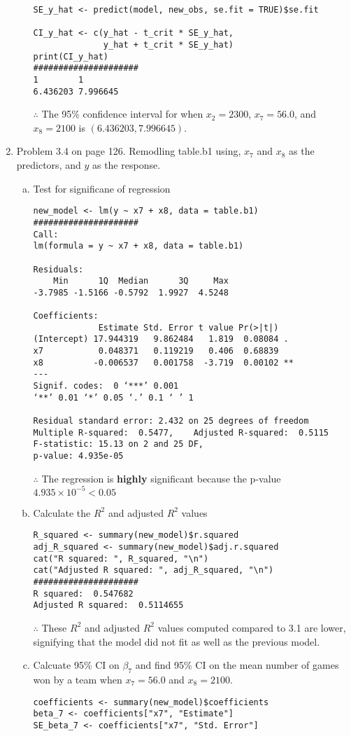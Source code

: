 \documentclass[12pt]{article}
\begin{document}
\begin{enumerate}[1.]
\begin{enumerate}[a.]
\begin{verbatim}
SE_y_hat <- predict(model, new_obs, se.fit = TRUE)$se.fit

CI_y_hat <- c(y_hat - t_crit * SE_y_hat, 
              y_hat + t_crit * SE_y_hat)
print(CI_y_hat)
#####################
1        1 
6.436203 7.996645 
                    \end{verbatim}
                    $\therefore$ The 95\% confidence interval for when $x_2 = 2300$, $x_7 = 56.0$, and $x_8 = 2100$ is $(6.436203, 7.996645)$.
                \end{enumerate}
        \item Problem 3.4 on page 126. Remodling table.b1 using, $x_7$ and $x_8$ as the predictors, and $y$ as the response.
            \begin{enumerate}[a.]
                \item Test for significane of regression 
                \begin{verbatim}
new_model <- lm(y ~ x7 + x8, data = table.b1)
#####################
Call:
lm(formula = y ~ x7 + x8, data = table.b1)

Residuals:
    Min      1Q  Median      3Q     Max 
-3.7985 -1.5166 -0.5792  1.9927  4.5248 

Coefficients:
             Estimate Std. Error t value Pr(>|t|)   
(Intercept) 17.944319   9.862484   1.819  0.08084 . 
x7           0.048371   0.119219   0.406  0.68839   
x8          -0.006537   0.001758  -3.719  0.00102 **
---
Signif. codes:  0 ‘***’ 0.001 
‘**’ 0.01 ‘*’ 0.05 ‘.’ 0.1 ‘ ’ 1

Residual standard error: 2.432 on 25 degrees of freedom
Multiple R-squared:  0.5477,	Adjusted R-squared:  0.5115 
F-statistic: 15.13 on 2 and 25 DF,  
p-value: 4.935e-05
                \end{verbatim}
                $\therefore$ The regression is \textbf{highly} significant because the p-value $4.935 \times 10^{-5} < 0.05$
                \item Calculate the $R^2$ and adjusted $R^2$ values
                \begin{verbatim}
R_squared <- summary(new_model)$r.squared
adj_R_squared <- summary(new_model)$adj.r.squared
cat("R squared: ", R_squared, "\n")
cat("Adjusted R squared: ", adj_R_squared, "\n")
#####################
R squared:  0.547682
Adjusted R squared:  0.5114655
                \end{verbatim}
                $\therefore$ These $R^2$ and adjusted $R^2$ values computed compared to 3.1 are lower, signifying
                that the model did not fit as well as the previous model.
                \item Calcuate 95\% CI on $\beta_7$ and find 95\% CI on the mean number of games won by 
                a team when $x_7 = 56.0$ and $x_8 = 2100$.
                \begin{verbatim}
coefficients <- summary(new_model)$coefficients
beta_7 <- coefficients["x7", "Estimate"]
SE_beta_7 <- coefficients["x7", "Std. Error"]


\end{verbatim}
\end{enumerate}
\end{enumerate}
\end{document}
